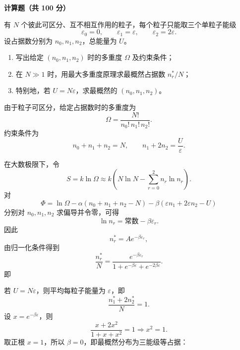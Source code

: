 ﻿


\textbf{计算题（共 100 分）}

\begin{question}[16分]
有 $N$ 个彼此可区分、互不相互作用的粒子，每个粒子只能取三个单粒子能级
\[
\varepsilon_0=0,\qquad \varepsilon_1=\varepsilon,\qquad \varepsilon_2=2\varepsilon.
\]
设占据数分别为 $n_0,n_1,n_2$，总能量为 $U$。
\begin{enumerate}[label=（\arabic*）,leftmargin=2.8em,itemsep=0.2em]
\item 写出给定 $(n_0,n_1,n_2)$ 时的多重度 $\Omega$ 及约束条件；
\item 在 $N\gg1$ 时，用最大多重度原理求最概然占据数 $n_r^\ast/N$；
\item 特别地，若 $U=N\varepsilon$，求最概然的 $(n_0,n_1,n_2)$。
\end{enumerate}
\begin{solution}

由于粒子可区分，给定占据数时的多重度为
\[
\Omega=\frac{N!}{n_0!\,n_1!\,n_2!}.
\]
约束条件为
\[
n_0+n_1+n_2=N,\qquad
n_1+2n_2=\frac{U}{\varepsilon}.
\]

在大数极限下，令
\[
S=k\ln\Omega
\approx k\left(N\ln N-\sum_{r=0}^2 n_r\ln n_r\right).
\]
对
\[
\Phi=\ln\Omega-\alpha(n_0+n_1+n_2-N)-\beta(\varepsilon n_1+2\varepsilon n_2-U)
\]
分别对 $n_0,n_1,n_2$ 求偏导并令零，可得
\[
\ln n_r = \text{常数}-\beta \varepsilon_r.
\]
因此
\[
n_r^\ast = A e^{-\beta\varepsilon_r},
\]
由归一化条件得到
\[
\frac{n_r^\ast}{N}=
\frac{e^{-\beta\varepsilon_r}}{1+e^{-\beta\varepsilon}+e^{-2\beta\varepsilon}}.
\]
即

若 $U=N\varepsilon$，则平均每粒子能量为 $\varepsilon$，即
\[
\frac{n_1^\ast+2n_2^\ast}{N}=1.
\]
设 $x=e^{-\beta\varepsilon}$，则
\[
\frac{x+2x^2}{1+x+x^2}=1
\Longrightarrow x^2=1.
\]
取正根 $x=1$，所以 $\beta=0$，即最概然分布为三能级等占据：
\end{solution}
\end{question}

